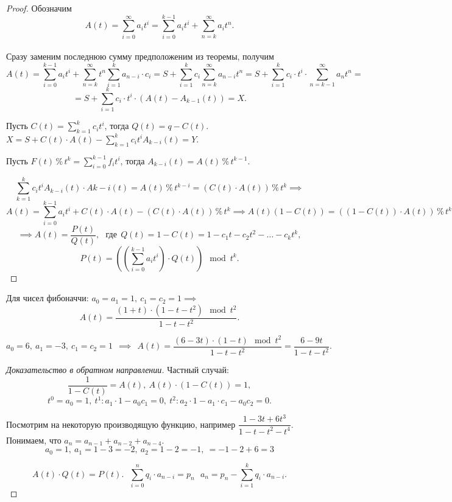 \begin{proof}
    Обозначим
    \[
        A(t ) = \sum_{i=0}^\infty a_i t^i = \sum_{i=0}^{k-1} a_i t^i + \sum_{n = k} ^ \infty a_i t^n. 
    \]\\
    Сразу заменим последнюю сумму предположеним из теоремы, получим
    \[ 
        A(t ) = \sum_{i=0}^{k-1} a_i t^i + \sum_{n = k} ^ \infty t^n \sum_{i=1}^k a_{n-i} \cdot c_i
    = S + \sum_{i=1}^k c_i \sum_{n=k}^\infty a_{n-i} t^n
    = S + \sum_{i=1}^k c_i \cdot t^i \cdot \sum_{n = k - 1} ^\infty a_n t^n = \]
    \[
        = S + \sum_{i=1}^k c_i \cdot t^i \cdot \left( A(t) - A_{k-1} (t) \right) = X.
    \]

    Пусть $C(t) = \sum_{k=1}^k c_i t^i$, тогда $Q(t) = q - C(t)$.~~~
    $X = S + C(t) \cdot A(t) - \sum_{k=1}^k c_i t^i A_{k-i}(t) = Y$.

    Пусть $F(t)\, \% \,t ^ k = \sum_{i=0}^{k-1} f_i t^i$, тогда $A _{k-i} (t) = A(t) \,\%\, t^{k-1}$.

    \[
        \sum_{k=1}^k c_i t^i A_{k-i}(t) \cdot A{k-i} (t) = A(t) \,\%\, t^{k-i} = \left( C(t) \cdot A(t) \right) \,\%\, t^k \implies
    \]
    \[
        A(t) = \sum_{i=0}^{k-1} a_i t^i + C(t) \cdot A(t) - (C(t) \cdot A(t) ) \,\%\, t^k \implies
        A(t)(1 - C(t)) = \left( (1 - C(t) ) \cdot A(t) \right) \,\%\, t^k
    \]
    \[
        \implies A(t ) = \dfrac{P(t)}{Q(t)}, ~~~\text{где} ~~Q(t) = 1 - C(t) = 1 - c_1 t - c_2 t^2 - \dots - c_k t^k,
    \]
    \[
        P(t) = \left( \left( \sum_{i=0}^{k-1} a_i t^i \right) \cdot Q(t) \right) \mod t^k.
    \]
\end{proof}

\begin{example}
    Для чисел фибоначчи:
    $a_0 = a_1 = 1, ~ c_1 = c_2 = 1 \implies$
    \[
    A(t) = \dfrac{(1 + t) \cdot (1 - t - t^2) \mod t^2}{1 - t - t^2}.
    \]

    \[ a_0 = 6, ~a_1 = -3, ~ c_1 = c_2 = 1~~ \implies~~
    A(t) = \dfrac{(6 - 3 t) \cdot (1 - t) \mod t^2}{1 - t - t^2} = \dfrac{6 - 9t}{1-t-t^2}.
    \]
\end{example}



\begin{proof}[Доказательство в обратном направлении]
    Частный случай:
    \[\dfrac{1}{1-C(t)} = A(t),~ A(t) \cdot (1 - C(t)) = 1, \]
    \[ t^ 0 = a_0 = 1, ~ t^1: a_1 \cdot 1 - a_0 c_1 = 0, ~ t^2: a_2 \cdot 1 - a_1 \cdot c_1 - a_0 c_2 = 0. \]

    Посмотрим на некоторую производящую функцию, например
    $\dfrac{1 - 3t +6t^3}{1-t-t^2 - t^4}$.
    Понимаем, что $a_n = a_{n-1} + a_{n-2} + a_{n-4}$. 
    \[ a_0 = 1,~ a_1 = 1 - 3 = -2,~ a_2 = 1 - 2 = -1,~ = -1 -2+6 = 3 \]

    \[ A(t) \cdot Q(t) = P(t).~~~
    \sum_{i = 0}^{n} q_i \cdot a_{n-i} = p_n~~~
    a_n = p_n - \sum_{i=1}^k q_i \cdot a_{n-i}. \]
\end{proof}

